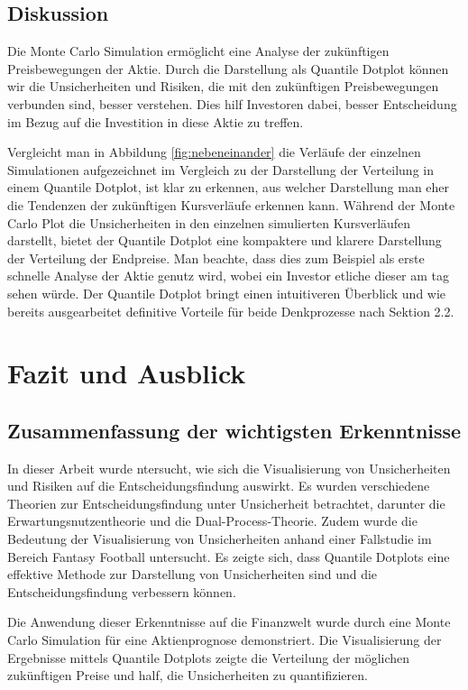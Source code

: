 \subsection{Diskussion}
Die Monte Carlo Simulation ermöglicht eine Analyse der zukünftigen Preisbewegungen der Aktie. Durch die Darstellung als Quantile Dotplot können wir die Unsicherheiten und Risiken, die mit den zukünftigen Preisbewegungen verbunden sind, besser verstehen. Dies hilf Investoren dabei, besser Entscheidung im Bezug auf die Investition in diese Aktie zu treffen.

Vergleicht man in Abbildung \ref{fig:nebeneinander} die Verläufe der einzelnen Simulationen aufgezeichnet im Vergleich zu der Darstellung der Verteilung in einem Quantile Dotplot, ist klar zu erkennen, aus welcher Darstellung man eher die Tendenzen der zukünftigen Kursverläufe erkennen kann. Während der Monte Carlo Plot die Unsicherheiten in den einzelnen simulierten Kursverläufen darstellt, bietet der Quantile Dotplot eine kompaktere und klarere Darstellung der Verteilung der Endpreise. Man beachte, dass dies zum Beispiel als erste schnelle Analyse der Aktie genutz wird, wobei ein Investor etliche dieser am tag sehen würde.
Der Quantile Dotplot bringt einen intuitiveren Überblick und wie bereits ausgearbeitet definitive Vorteile für beide Denkprozesse nach Sektion 2.2.

\section{Fazit und Ausblick}

\subsection{Zusammenfassung der wichtigsten Erkenntnisse}

In dieser Arbeit wurde ntersucht, wie sich die Visualisierung von Unsicherheiten und Risiken auf die Entscheidungsfindung auswirkt. Es wurden verschiedene Theorien zur Entscheidungsfindung unter Unsicherheit betrachtet, darunter die Erwartungsnutzentheorie und die Dual-Process-Theorie. Zudem wurde die Bedeutung der Visualisierung von Unsicherheiten anhand einer Fallstudie im Bereich Fantasy Football untersucht. Es zeigte sich, dass Quantile Dotplots eine effektive Methode zur Darstellung von Unsicherheiten sind und die Entscheidungsfindung verbessern können.

Die Anwendung dieser Erkenntnisse auf die Finanzwelt wurde durch eine Monte Carlo Simulation für eine Aktienprognose demonstriert. Die Visualisierung der Ergebnisse mittels Quantile Dotplots zeigte die Verteilung der möglichen zukünftigen Preise und half, die Unsicherheiten zu quantifizieren.

